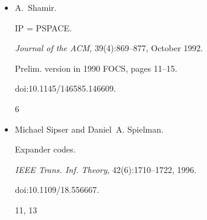 \begin{itemize}
R. Raz and S. Safra.


A sub-constant error-probability low-degree test, and a sub-constant
error-probability PCP characterization of NP.


In \emph{STOC 1997}, pages 475–484, 1997.


7




\item[] 
[34]

A. Shamir.


IP = PSPACE.


\emph{Journal of the ACM}, 39(4):869–877, October 1992.


Prelim. version in 1990 FOCS, pages 11–15.


doi:10.1145/146585.146609.


6




\item[] 
[35]

Michael Sipser and Daniel A. Spielman.


Expander codes.


\emph{IEEE Trans. Inf. Theory}, 42(6):1710–1722, 1996.


doi:10.1109/18.556667.


11, 13




\end{itemize}

